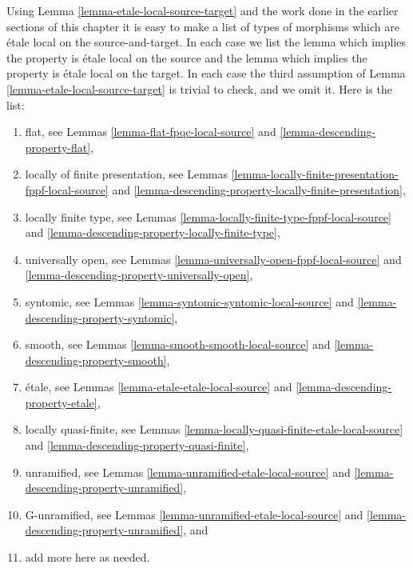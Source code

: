 \begin{remark}
\label{remark-list-local-source-target}
Using
Lemma \ref{lemma-etale-local-source-target}
and the work done in the earlier sections of this chapter it is easy
to make a list of types of morphisms which are \'etale local on the
source-and-target. In each case we list the lemma which implies
the property is \'etale local on the source and the lemma which implies
the property is \'etale local on the target. In each case the third assumption
of
Lemma \ref{lemma-etale-local-source-target}
is trivial to check, and we omit it. Here is the list:
\begin{enumerate}
\item flat, see
Lemmas \ref{lemma-flat-fpqc-local-source} and
\ref{lemma-descending-property-flat},
\item locally of finite presentation, see
Lemmas \ref{lemma-locally-finite-presentation-fppf-local-source} and
\ref{lemma-descending-property-locally-finite-presentation},
\item locally finite type, see
Lemmas \ref{lemma-locally-finite-type-fppf-local-source} and
\ref{lemma-descending-property-locally-finite-type},
\item universally open, see
Lemmas \ref{lemma-universally-open-fppf-local-source} and
\ref{lemma-descending-property-universally-open},
\item syntomic, see
Lemmas \ref{lemma-syntomic-syntomic-local-source} and
\ref{lemma-descending-property-syntomic},
\item smooth, see
Lemmas \ref{lemma-smooth-smooth-local-source} and
\ref{lemma-descending-property-smooth},
\item \'etale, see
Lemmas \ref{lemma-etale-etale-local-source} and
\ref{lemma-descending-property-etale},
\item locally quasi-finite, see
Lemmas \ref{lemma-locally-quasi-finite-etale-local-source} and
\ref{lemma-descending-property-quasi-finite},
\item unramified, see
Lemmas \ref{lemma-unramified-etale-local-source} and
\ref{lemma-descending-property-unramified},
\item G-unramified, see
Lemmas \ref{lemma-unramified-etale-local-source} and
\ref{lemma-descending-property-unramified}, and
\item add more here as needed.
\end{enumerate}
\end{remark}

